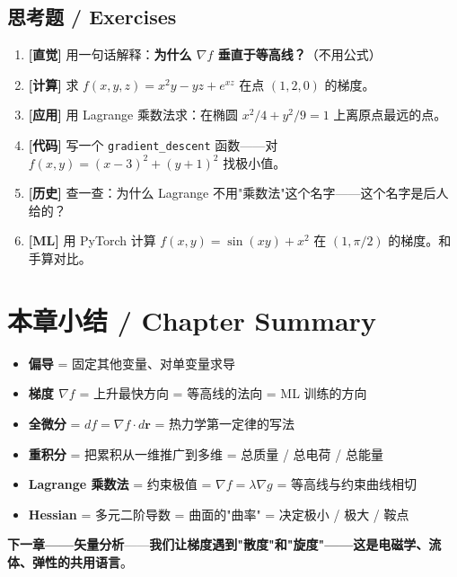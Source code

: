 \subsection{思考题 / Exercises}

\begin{enumerate}
\item \textbf{[直觉]} 用一句话解释：\textbf{为什么 $\nabla f$ 垂直于等高线？}（不用公式）
\item \textbf{[计算]} 求 $f(x,y,z) = x^2 y - yz + e^{xz}$ 在点 $(1, 2, 0)$ 的梯度。
\item \textbf{[应用]} 用 Lagrange 乘数法求：在椭圆 $x^2/4 + y^2/9 = 1$ 上离原点最远的点。
\item \textbf{[代码]} 写一个 \texttt{gradient\_descent} 函数——对 $f(x,y) = (x-3)^2 + (y+1)^2$ 找极小值。
\item \textbf{[历史]} 查一查：为什么 Lagrange 不用"乘数法"这个名字——这个名字是后人给的？
\item \textbf{[ML]} 用 PyTorch 计算 $f(x, y) = \sin(xy) + x^2$ 在 $(1, \pi/2)$ 的梯度。和手算对比。
\end{enumerate}

\section{本章小结 / Chapter Summary}

\begin{tcolorbox}[essbox={本章核心}]
\begin{itemize}
\item \textbf{偏导} = 固定其他变量、对单变量求导
\item \textbf{梯度 $\nabla f$} = 上升最快方向 = 等高线的法向 = ML 训练的方向
\item \textbf{全微分} = $df = \nabla f \cdot d\bm{r}$ = 热力学第一定律的写法
\item \textbf{重积分} = 把累积从一维推广到多维 = 总质量 / 总电荷 / 总能量
\item \textbf{Lagrange 乘数法} = 约束极值 = $\nabla f = \lambda \nabla g$ = 等高线与约束曲线相切
\item \textbf{Hessian} = 多元二阶导数 = 曲面的"曲率" = 决定极小 / 极大 / 鞍点
\end{itemize}
\end{tcolorbox}

\textbf{下一章——矢量分析}——\textbf{我们让梯度遇到"散度"和"旋度"——这是电磁学、流体、弹性的共用语言}。

\clearpage
